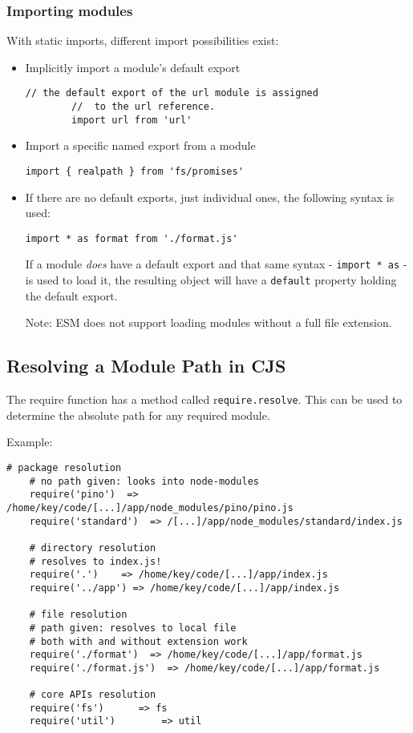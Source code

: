 \documentclass{scrartcl}
\begin{document}
\subsubsection{Importing modules}

With static imports, different import possibilities exist:

\begin{itemize}
    \item Implicitly import a module's default export
    \begin{lstlisting}[style=ES6]
        // the default export of the url module is assigned
        //  to the url reference.
        import url from 'url'
    \end{lstlisting}

    \item Import a specific named export from a module
    \begin{lstlisting}[style=ES6]
        import { realpath } from 'fs/promises'
    \end{lstlisting}

    \item If there are no default exports, just individual ones, the following syntax is used:
    \begin{lstlisting}[style=ES6]
        import * as format from './format.js'
    \end{lstlisting}

    If a module \textit{does} have a default export and that same syntax - \lstinline|import * as| - is used to load it, the resulting object will have a \lstinline|default| property holding the default export.

    Note: ESM does not support loading modules without a  full file extension.
\end{itemize}

\subsection{Resolving a Module Path in CJS}
The require function has a method called r\lstinline|equire.resolve|. This can be used to determine the absolute path for any required module.

Example:

\begin{lstlisting}[style=ES6]
    # package resolution
    # no path given: looks into node-modules
    require('pino')  => /home/key/code/[...]/app/node_modules/pino/pino.js
    require('standard')  => /[...]/app/node_modules/standard/index.js

    # directory resolution
    # resolves to index.js!
    require('.') 	=> /home/key/code/[...]/app/index.js
    require('../app') => /home/key/code/[...]/app/index.js

    # file resolution
    # path given: resolves to local file
    # both with and without extension work
    require('./format')  => /home/key/code/[...]/app/format.js
    require('./format.js')  => /home/key/code/[...]/app/format.js

    # core APIs resolution
    require('fs') 	   => fs
    require('util') 	   => util

\end{lstlisting}
\end{document}
